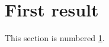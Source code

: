 \documentclass{article}
\begin{document}
\section{First result}\label{sec:first}
This section is numbered \ref{sec:first}.
\end{document}
